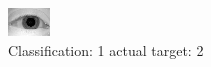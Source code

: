 \begin{figure}[h!]
\begin{center}
\includegraphics[width=0.60\columnwidth]{figures/ID912_class_1_target_2.png}
\end{center}
\caption{ Classification: 1 actual target: 2}
\label{fig:ID912_class_1_target_2}
\end{figure}

